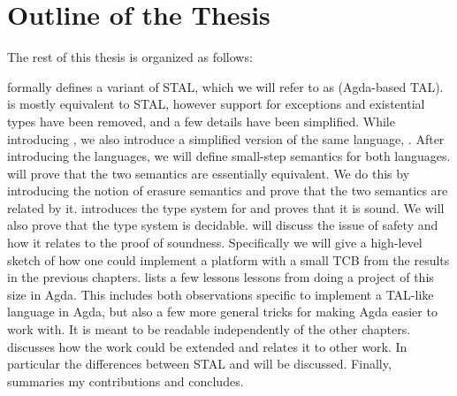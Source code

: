 \section{Outline of the Thesis}

The rest of this thesis is organized as follows:

\textbf{} formally defines a variant of STAL, which we will
refer to as \ATAL (Agda-based TAL). \ATAL is mostly equivalent to STAL, however
support for exceptions and existential types have been removed, and a few
details have been simplified. While introducing \ATAL, we also introduce a
simplified version of the same language, \ATALe. After introducing the
languages, we will define small-step semantics for both
languages. \textbf{} will prove that the two semantics are
essentially equivalent. We do this by introducing the notion of erasure
semantics and prove that the two semantics are related by
it. \textbf{} introduces the type system for \ATAL and proves
that it is sound. We will also prove that the type system is
decidable. \textbf{} will discuss the issue of safety and
how it relates to the proof of soundness. Specifically we will give a high-level
sketch of how one could implement a platform with a small TCB from the results
in the previous chapters. \textbf{} lists a few lessons
lessons from doing a project of this size in Agda. This includes both
observations specific to implement a TAL-like language in Agda, but also a few
more general tricks for making Agda easier to work with. It is meant to be
readable independently of the other chapters. \textbf{}
discusses how the work could be extended and relates it to other work. In
particular the differences between STAL and \ATAL will be discussed. Finally,
\textbf{} summaries my contributions and concludes.
